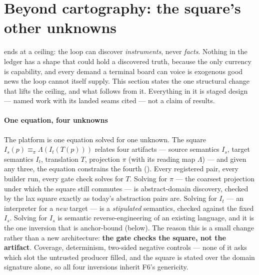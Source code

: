 
\section{Beyond cartography: the square's other unknowns}
\label{sec:vision}

 ends at a ceiling: the loop can discover
\emph{instruments}, never \emph{facts}. Nothing in the ledger has a
shape that could hold a discovered truth, because the only currency
is capability, and every demand a terminal board can voice is
exogenous good news the loop cannot itself supply. This section
states the one structural change that lifts the ceiling, and what
follows from it. Everything in it is staged design --- named work
with its landed seams cited --- not a claim of results.

\paragraph{One equation, four unknowns}
The platform is one equation solved for one unknown. The square
$I_s(p) \equiv_\pi \Lambda(I_t(T(p)))$ relates four artifacts ---
source semantics $I_s$, target semantics $I_t$, translation $T$,
projection $\pi$ (with its reading map $\Lambda$) --- and given any
three, the equation constrains the fourth
(). Every registered pair, every builder run,
every gate check solves for $T$. Solving for $\pi$ --- the coarsest
projection under which the square still commutes --- is
abstract-domain discovery, checked by the lax square exactly as
today's abstraction pairs are. Solving for $I_t$ --- an interpreter
for a \emph{new} target --- is a \emph{stipulated} semantics, checked
against the fixed $I_s$. Solving for $I_s$ is semantic
reverse-engineering of an existing language, and it is the one
inversion that is anchor-bound (below). The reason this is a small
change rather than a new architecture: \textbf{the gate checks the
square, not the artifact}. Coverage, determinism, two-sided negative
controls --- none of it asks which slot the untrusted producer
filled, and the square is stated over the domain signature alone, so
all four inversions inherit F6's genericity.

